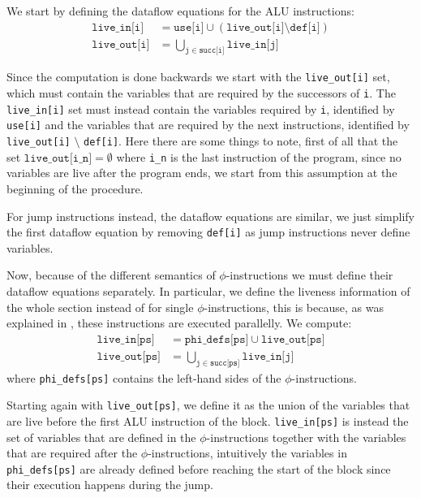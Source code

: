 We start by defining the dataflow equations for the ALU instructions:
\begin{align*}
  \texttt{live\_in[i]} &= \texttt{use[i]} \cup (\texttt{live\_out[i]} \setminus \texttt{def[i]}) \\
  \texttt{live\_out[i]} &= \bigcup \limits_{\texttt j \in \texttt{succ[i]}} \texttt{live\_in[j]}
\end{align*}

Since the computation is done backwards we start with the \texttt{live\_out[i]} set, which must contain the variables that are required by the successors of \texttt i. The
\texttt{live\_in[i]} set must instead contain the variables required by \texttt i, identified by \texttt{use[i]} and the variables that are required by the next instructions, identified by \texttt{live\_out[i]} $\setminus$ \texttt{def[i]}.
Here there are some things to note, first of all that the set $\texttt{live\_out[i\_n]} = \emptyset$ where \texttt{i\_n} is the last instruction of the program, since no variables are live after the program ends, we start from this assumption at the beginning of the procedure.

For jump instructions instead, the dataflow equations are similar, we just simplify the first dataflow equation by removing \texttt{def[i]} as jump instructions never define variables.

Now, because of the different semantics of $\phi$-instructions we must define their dataflow equations separately. In particular, we define the liveness information of the whole section instead of for single $\phi$-instructions, this is because, as was explained in , these instructions are executed parallelly.
We compute:
\begin{align*}
  \texttt{live\_in[ps]} &= \texttt{phi\_defs[ps]} \cup \texttt{live\_out[ps]} \\
  \texttt{live\_out[ps]} &= \bigcup \limits_{\texttt j \in \texttt{succ[ps]}} \texttt{live\_in[j]}
\end{align*}
where \texttt{phi\_defs[ps]} contains the left-hand sides of the $\phi$-instructions.

Starting again with \texttt{live\_out[ps]}, we define it as the union of the variables that are live before the first ALU instruction of the block. \texttt{live\_in[ps]} is instead the set of variables that are defined in the $\phi$-instructions together with the variables that are required after the $\phi$-instructions, intuitively the variables in \texttt{phi\_defs[ps]} are already defined before reaching the start of the block since their execution happens during the jump.

